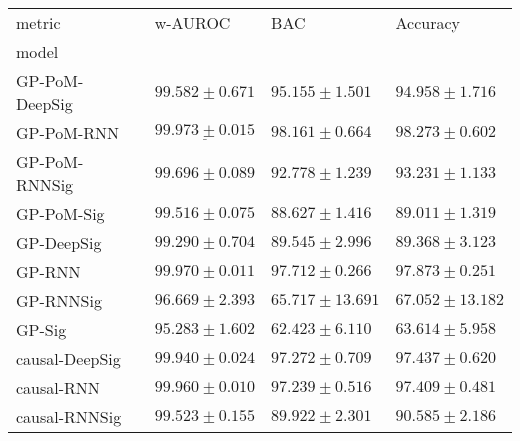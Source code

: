 \begin{tabular}{llll}
\toprule
metric &                                        w-AUROC &                                            BAC &                                       Accuracy \\
model          &                                                &                                                &                                                \\
\midrule
GP-PoM-DeepSig &                           $ 99.582 \pm 0.671 $ &                           $ 95.155 \pm 1.501 $ &                           $ 94.958 \pm 1.716 $ \\
GP-PoM-RNN     &            $  \underline{ 99.973 \pm 0.015 } $ &               $  \mathbf{ 98.161 \pm 0.664 } $ &               $  \mathbf{ 98.273 \pm 0.602 } $ \\
GP-PoM-RNNSig  &                           $ 99.696 \pm 0.089 $ &                           $ 92.778 \pm 1.239 $ &                           $ 93.231 \pm 1.133 $ \\
GP-PoM-Sig     &                           $ 99.516 \pm 0.075 $ &                           $ 88.627 \pm 1.416 $ &                           $ 89.011 \pm 1.319 $ \\
GP-DeepSig     &                           $ 99.290 \pm 0.704 $ &                           $ 89.545 \pm 2.996 $ &                           $ 89.368 \pm 3.123 $ \\
GP-RNN         &                           $ 99.970 \pm 0.011 $ &                           $ 97.712 \pm 0.266 $ &                           $ 97.873 \pm 0.251 $ \\
GP-RNNSig      &                           $ 96.669 \pm 2.393 $ &                          $ 65.717 \pm 13.691 $ &                          $ 67.052 \pm 13.182 $ \\
GP-Sig         &                           $ 95.283 \pm 1.602 $ &                           $ 62.423 \pm 6.110 $ &                           $ 63.614 \pm 5.958 $ \\
causal-DeepSig &                           $ 99.940 \pm 0.024 $ &                           $ 97.272 \pm 0.709 $ &                           $ 97.437 \pm 0.620 $ \\
causal-RNN     &                           $ 99.960 \pm 0.010 $ &                           $ 97.239 \pm 0.516 $ &                           $ 97.409 \pm 0.481 $ \\
causal-RNNSig  &                           $ 99.523 \pm 0.155 $ &                           $ 89.922 \pm 2.301 $ &                           $ 90.585 \pm 2.186 $ \\

\end{tabular}
